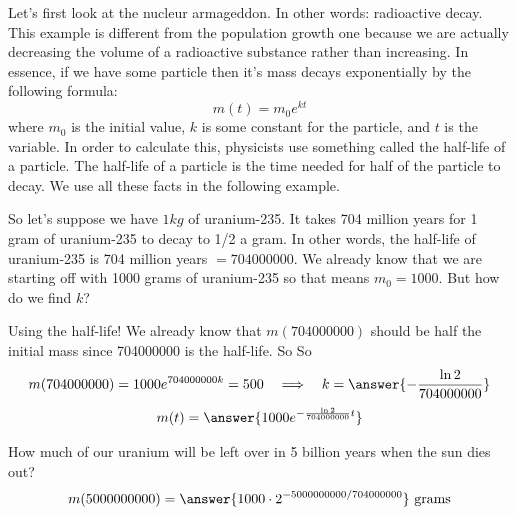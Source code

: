 \documentclass{ximera}
\begin{document}
\begin{example}\label{example:8-3}
Let's first look at the nucleur armageddon. In other words: radioactive decay. This example is different from the population growth one because we are actually decreasing the volume of a radioactive substance rather than increasing. In essence, if we have some particle then it's mass decays exponentially by the following formula:
\[
m(t)=m_{0} e^{k t}
\]
where $m_{0}$ is the initial value, $k$ is some constant for the particle, and $t$ is the variable. In order to calculate this, physicists use something called the half-life of a particle. The half-life of a particle is the time needed for half of the particle to decay. We use all these facts in the following example.

So let's suppose we have $1 kg$ of uranium-235. It takes 704 million years for 1 gram of uranium-235 to decay to 1/2 a gram. In other words, the half-life of uranium-235 is 704 million years $=704000000$. We already know that we are starting off with 1000 grams of uranium-235 so that means $m_{0}=1000$. But how do we find $k$?

Using the half-life! We already know that $m(704000000)$ should be half the initial mass since 704000000 is the half-life. So So
\[
m(704000000)=1000e^{704000000k}=500
\quad\Longrightarrow\quad
k=\answer{-\frac{\ln 2}{704000000}}
\]
\[
m(t)=\answer{1000e^{-\frac{\ln 2}{704000000}t}}
\]

How much of our uranium will be left over in 5 billion years when the sun dies out?
\[
m(5000000000)=\answer{1000\cdot 2^{-5000000000/704000000}}\text{ grams}
\]
\end{example}
\end{document}
